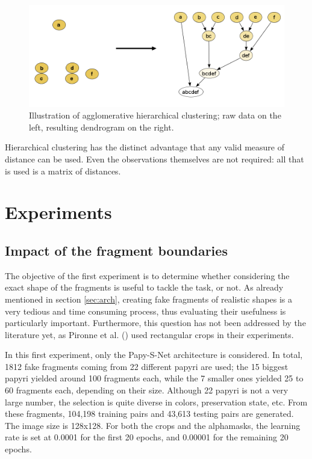 \documentclass[11pt]{report}
\begin{document}
\begin{figure}[h!]
\centering\includegraphics[width=12cm]{hierar.png}
\caption{Illustration of agglomerative hierarchical clustering; raw data on the left, resulting dendrogram on the right.}
\label{ROCexemple}
\end{figure}

Hierarchical clustering has the distinct advantage that any valid measure of distance can be used. Even the observations themselves are not required: all that is used is a matrix of distances.

\chapter{Experiments}

\section{Impact of the fragment boundaries}\label{experimentbound}

The objective of the first experiment is to determine whether considering the exact shape of the fragments is useful to tackle the task, or not. As already mentioned in section \ref{sec:arch}, creating fake fragments of realistic shapes is a very tedious and time consuming process, thus evaluating their usefulness is particularly important. Furthermore, this question has not been addressed by the literature yet, as Pironne et al. (\cite{pir19}) used rectangular crops in their experiments. \newline

In this first experiment, only the Papy-S-Net architecture is considered.\newline
In total, 1812 fake fragments coming from 22 different papyri are used; the 15 biggest papyri yielded around 100 fragments each, while the 7 smaller ones yielded 25 to 60 fragments each, depending on their size. Although 22 papyri is not a very large number, the selection is quite diverse in colors, preservation state, etc.\newline
From these fragments, 104,198 training pairs and 43,613 testing pairs are generated. The image size is 128x128.\newline
For both the crops and the alphamasks, the learning rate is set at 0.0001 for the first 20 epochs, and 0.00001 for the remaining 20 epochs.
\end{document}
